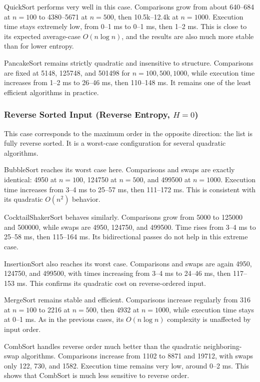 \documentclass{article}
\begin{document}
QuickSort performs very well in this case. Comparisons grow from about 640--684 at $n=100$ to 4380--5671 at $n=500$, then 10.5k--12.4k at $n=1000$. Execution time stays extremely low, from 0--1 ms to 0--1 ms, then 1--2 ms. This is close to its expected average-case $O(n \log n)$, and the results are also much more stable than for lower entropy.

PancakeSort remains strictly quadratic and insensitive to structure. Comparisons are fixed at 5148, 125748, and 501498 for $n=100,500,1000$, while execution time increases from 1--2 ms to 26--46 ms, then 110--148 ms. It remains one of the least efficient algorithms in practice.


\subsubsection{Reverse Sorted Input (Reverse Entropy, $H = 0$)}

This case corresponds to the maximum order in the opposite direction: the list is fully reverse sorted. It is a worst-case configuration for several quadratic algorithms.

BubbleSort reaches its worst case here. Comparisons and swaps are exactly identical: 4950 at $n=100$, 124750 at $n=500$, and 499500 at $n=1000$. Execution time increases from 3--4 ms to 25--57 ms, then 111--172 ms. This is consistent with its quadratic $O(n^2)$ behavior.

CocktailShakerSort behaves similarly. Comparisons grow from 5000 to 125000 and 500000, while swaps are 4950, 124750, and 499500. Time rises from 3--4 ms to 25--58 ms, then 115--164 ms. Its bidirectional passes do not help in this extreme case.

InsertionSort also reaches its worst case. Comparisons and swaps are again 4950, 124750, and 499500, with times increasing from 3--4 ms to 24--46 ms, then 117--153 ms. This confirms its quadratic cost on reverse-ordered input.

MergeSort remains stable and efficient. Comparisons increase regularly from 316 at $n=100$ to 2216 at $n=500$, then 4932 at $n=1000$, while execution time stays at 0--1 ms. As in the previous cases, its $O(n \log n)$ complexity is unaffected by input order.

CombSort handles reverse order much better than the quadratic neighboring-swap algorithms. Comparisons increase from 1102 to 8871 and 19712, with swaps only 122, 730, and 1582. Execution time remains very low, around 0--2 ms. This shows that CombSort is much less sensitive to reverse order.
\end{document}
